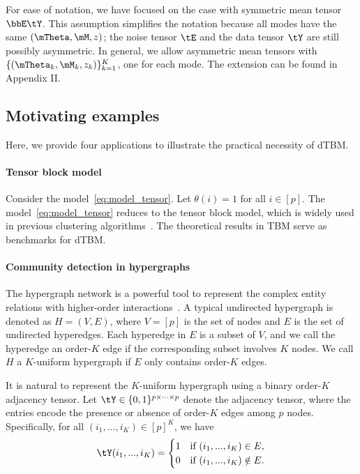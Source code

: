 \documentclass[lettersize,onecolumn,journal]{IEEEtran}
\theoremstyle{definition}
\theoremstyle{definition}
\begin{document}
  {For ease of notation, we have focused on the case with symmetric mean tensor $\bbE \tY$. This assumption simplifies the notation because all modes have the same $(\mTheta, \mM, z)$; the noise tensor $\tE$ and the data tensor $\tY$ are still possibly asymmetric. In general, we allow asymmetric mean tensors with $\{(\mTheta_k, \mM_k, z_k)\}_{k=1}^K$, one for each mode. The extension can be found in Appendix II.}

\subsection{Motivating examples}\label{subsec:motiv} Here, we provide four applications to illustrate the practical necessity of dTBM.

\vspace{0.2cm}
\paragraph{Tensor block model} Consider the model~\eqref{eq:model_tensor}. Let $\theta(i)=1$ for all $ i \in [p]$. The model~\eqref{eq:model_tensor} reduces to the tensor block model, which is widely used in previous clustering algorithms~\citep{wang2019multiway,chi2020provable,han2020exact}. The theoretical results in TBM serve as benchmarks for dTBM.  

\vspace{0.2cm}

\paragraph{Community detection in hypergraphs} The hypergraph network is a powerful tool to represent the complex entity relations with higher-order interactions~\citep{ke2019community}. A typical undirected hypergraph is denoted as $H = (V,E)$, where $V = [p]$ is the set of nodes and $E$ is the set of undirected hyperedges. Each hyperedge in $E$ is a subset of $V$, and we call the hyperedge an order-$K$ edge if the corresponding subset involves $K$ nodes. We call $H$ a $K$-uniform hypergraph if $E$ only contains order-$K$ edges. 

It is natural to represent the $K$-uniform hypergraph using a binary order-$K$ adjacency tensor. Let $\tY \in \{0,1\}^{p \times \cdots \times p}$ denote the adjacency tensor, where the entries encode the presence or absence of order-$K$ edges among $p$ nodes. Specifically, for all $(i_1,\ldots,i_K) \in [p]^K$, we have
\begin{equation}
    \tY(i_1,...,i_K) =  \begin{cases}
    1  & \text{if }  (i_1,...,i_K) \in E,\\
    0 & \text{if }  (i_1,...,i_K) \notin E.
    \end{cases}
\end{equation}
\end{document}
